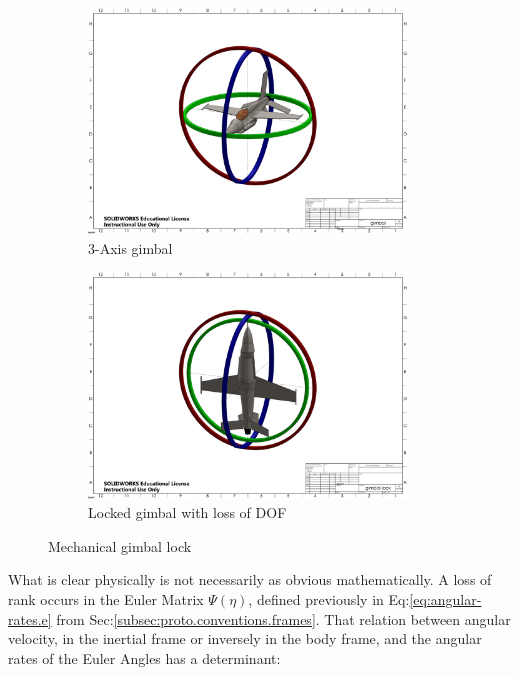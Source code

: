 \begin{figure}[htbp]
\begin{subfigure}{0.5\textwidth}
\centering
\includegraphics[clip, trim=16.5cm 8.5cm 16.5cm 6.7cm, width=0.93\textwidth]{pdfpages/gimbal}
\caption{3-Axis gimbal}
\label{fig:gimbal}
\end{subfigure}
\begin{subfigure}{0.5\textwidth}
\centering
\includegraphics[clip, trim=16.5cm 8.5cm 16.5cm 6.7cm, width=0.93\textwidth]{pdfpages/gimbal-lock}
\caption{Locked gimbal with loss of DOF}
\label{fig:gimbal-lock}
\end{subfigure}
\caption{Mechanical gimbal lock}
\vspace{-10pt}
\end{figure} 
\par
What is clear physically is not necessarily as obvious mathematically. A loss of rank occurs in the Euler Matrix $\Psi(\eta)$, defined previously in Eq:\ref{eq:angular-rates.e} from Sec:\ref{subsec:proto.conventions.frames}. That relation between angular velocity, in the inertial frame or inversely in the body frame, and the angular rates of the Euler Angles has a determinant:
